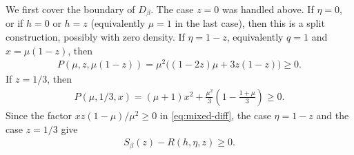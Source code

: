 \documentclass[10pt,a4paper]{article}
\begin{document}
    We first cover the boundary of $D_\beta$.  The case $z=0$ was handled above.
    If $\eta=0$, or if $h=0$ or $h=z$ (equivalently $\mu=1$ in the last case), then this is a split construction,
    possibly with zero density.  If $\eta=1-z$, equivalently $q=1$ and
    $x=\mu(1-z)$, then
    \begin{align*}
      P(\mu,z,\mu(1-z))=\mu^2\bigl((1-2z)\mu+3z(1-z)\bigr)\ge0.
    \end{align*}
    If $z=1/3$, then
    \begin{align*}
      P(\mu,1/3,x)=(\mu+1)x^2+\frac{\mu^2}{3}\left(1-\frac{1+\mu}{3}\right)\ge0.
    \end{align*}
    Since the factor $xz(1-\mu)/\mu^2\ge0$ in \eqref{eq:mixed-diff}, the case
    $\eta=1-z$ and the case $z=1/3$ give
    \begin{align*}
      S_\beta(z)-R(h,\eta,z)\ge0.
    \end{align*}
    
\end{document}
